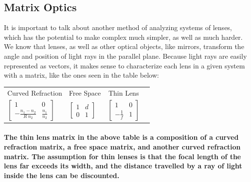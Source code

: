 \documentclass{amsart}
\begin{document}
\subsection{Matrix Optics\nopunct \\}
{It is important to talk about another method of analyzing systems of lenses, which has the potential to make complex much simpler, as well as much harder. We know that lenses, as well as other optical objects, like mirrors, transform the angle and position of light rays in the parallel plane. Because light rays are easily represented as vectors, it makes sense to characterize each lens in a given system with a matrix, like the ones seen in the table below:}

\begin{table}[H]
\centering
\label{my-label}
\begin{tabular}{llll}
\multicolumn{1}{c}{Curved Refraction}                                                           & \multicolumn{1}{c}{Free Space}                                & \multicolumn{1}{c}{Thin Lens}                                        &  \\
$\left[\begin{array}{cc}1 & 0 \\- \frac{n_1-n_2}{R \ n_2} & \frac{n_1}{n_2}\end{array}\right]$ & $\left[\begin{array}{cc}1 & d \\0 & 1\end{array}\right]$ & $\left[\begin{array}{cc}1 & 0 \\- \frac{1}{f} & 1\end{array}\right]$ &
\end{tabular}
\end{table}

\paragraph{The thin lens matrix in the above table is a composition of a curved refraction matrix, a free space matrix, and another curved refraction matrix. The assumption for thin lenses is that the focal length of the lens far exceeds its width, and the distance travelled by a ray of light inside the lens can be discounted.}
\end{document}
